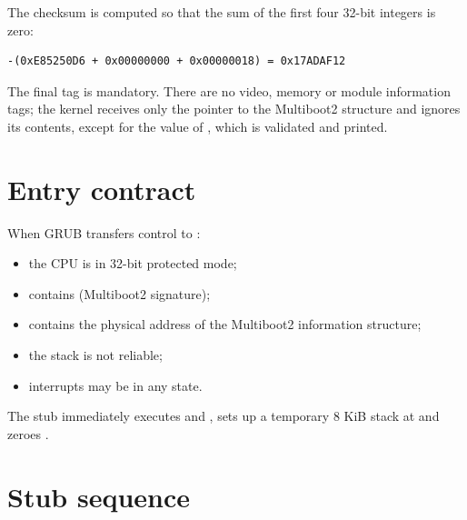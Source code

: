 The checksum is computed so that the sum of the first four 32-bit integers
is zero:

\begin{verbatim}
-(0xE85250D6 + 0x00000000 + 0x00000018) = 0x17ADAF12
\end{verbatim}

The final tag is mandatory. There are no video, memory or module information
tags; the kernel receives only the pointer to the
Multiboot2 structure and ignores its contents, except for the value of
, which is validated and printed.

\section{Entry contract}

When GRUB transfers control to :

\begin{itemize}
  \item the CPU is in 32-bit protected mode;
  \item {} contains  (Multiboot2 signature);
  \item {} contains the physical address of the Multiboot2
        information structure;
  \item the stack is not reliable;
  \item interrupts may be in any state.
\end{itemize}

The stub immediately executes  and , sets up a temporary
8 KiB stack at  and zeroes .

\section{Stub sequence}

